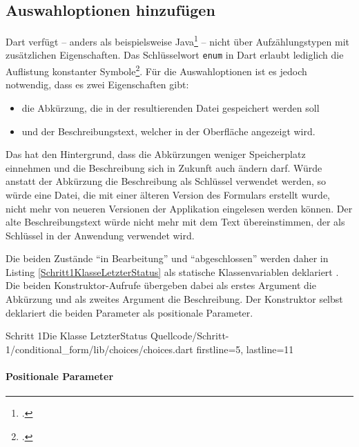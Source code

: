 
\subsection{Auswahloptionen hinzufügen}

Dart verfügt – anders als beispielsweise Java\footcite[Vgl.][S. 321]{TheJavaLanguageSpecificationJavaSE16Edition} – nicht über Aufzählungstypen mit zusätzlichen Eigenschaften. Das Schlüsselwort \texttt{enum} in Dart erlaubt lediglich die Auflistung konstanter Symbole\footcite[Vgl.][S. 74f.]{DartProgrammingLanguageSpecification5thedition}. Für die Auswahloptionen ist es jedoch notwendig, dass es zwei Eigenschaften gibt:
\begin{itemize}
  \parsep 0pt
  \topsep 0pt
  \itemsep 0pt

  \item die Abkürzung, die in der resultierenden Datei gespeichert werden soll
  \item und der Beschreibungstext, welcher in der Oberfläche angezeigt wird.
\end{itemize}
Das hat den Hintergrund, dass die Abkürzungen weniger Speicherplatz einnehmen und die Beschreibung sich in Zukunft auch ändern darf.
Würde anstatt der Abkürzung die Beschreibung als Schlüssel verwendet werden, so würde eine Datei, die mit einer älteren Version des Formulars erstellt wurde, nicht mehr von neueren Versionen der Applikation eingelesen werden können.
Der alte Beschreibungstext würde nicht mehr mit dem Text übereinstimmen, der als Schlüssel in der Anwendung verwendet wird.


Die beiden Zustände \enquote{in Bearbeitung} und \enquote{abgeschlossen} werden daher in Listing \ref{Schritt1KlasseLetzterStatus} als statische Klassenvariablen deklariert .
Die beiden Konstruktor-Aufrufe übergeben dabei als erstes Argument die Abkürzung und als zweites Argument die Beschreibung.
Der Konstruktor selbst  deklariert die beiden Parameter als positionale Parameter.



\begin{alexlisting}{Schritt 1}{Die Klasse LetzterStatus}
  {Quellcode/Schritt-1/conditional_form/lib/choices/choices.dart}
  {firstline=5, lastline=11}
  \label{lst:Schritt1KlasseLetzterStatus}
\end{alexlisting}



\paragraph{Positionale Parameter}

